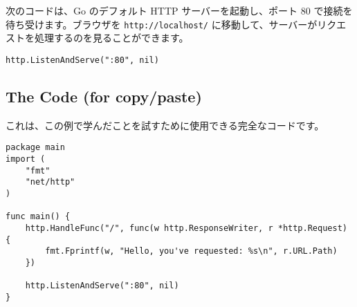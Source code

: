 次のコードは、Go のデフォルト HTTP サーバーを起動し、ポート 80 で接続を待ち受けます。ブラウザを \texttt{http://localhost/} に移動して、サーバーがリクエストを処理するのを見ることができます。

\begin{lstlisting}[numbers=none]
http.ListenAndServe(":80", nil)
\end{lstlisting}

\subsection{The Code (for copy/paste)}

これは、この例で学んだことを試すために使用できる完全なコードです。

\begin{lstlisting}[numbers=none]
package main
import (
    "fmt"
    "net/http"
)

func main() {
    http.HandleFunc("/", func(w http.ResponseWriter, r *http.Request) {
        fmt.Fprintf(w, "Hello, you've requested: %s\n", r.URL.Path)
    })

    http.ListenAndServe(":80", nil)
}
\end{lstlisting}


